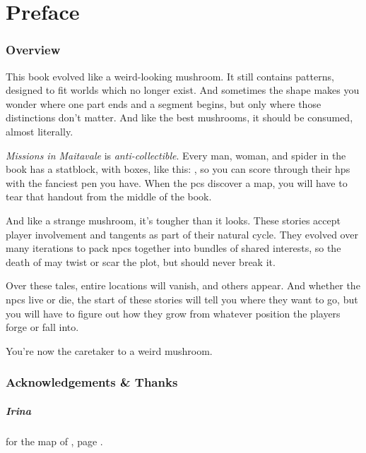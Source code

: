 \chapter{Preface}

\begin{multicols}{2}

\subsection*{Overview}

This book evolved like a weird-looking mushroom.
It still contains patterns, designed to fit worlds which no longer exist.
And sometimes the shape makes you wonder where one part ends and a segment begins, but only where those distinctions don't matter.
And like the best mushrooms, it should be consumed, almost literally.

\randomdozen
\textit{Missions in Maitavale} is \emph{anti-collectible}.
Every man, woman, and spider in the book has a statblock, with  boxes, like this: \setcounter{wounds}{3} , so you can score through their \glspl{hp} with the fanciest pen you have.
When the \glspl{pc} discover a map, you will have to tear that handout from the middle of the book.
\setcounter{wounds}{0}

And like a strange mushroom, it's tougher than it looks.
These stories accept player involvement and tangents as part of their natural cycle.
They evolved over many iterations to pack \glspl{npc} together into bundles of shared interests, so the death of  may twist or scar the plot, but should never break it.

Over these tales, entire locations will vanish, and others appear.
And whether the \glspl{npc} live or die, the start of these stories will tell you where they want to go, but you will have to figure out how they grow from whatever position the players forge or fall into.

You're now the caretaker to a weird mushroom.

\columnbreak

\subsection*{Acknowledgements \& Thanks}

\paragraph{Irina}
for the map of , page \pageref{Irina/greylands}.


\end{multicols}
